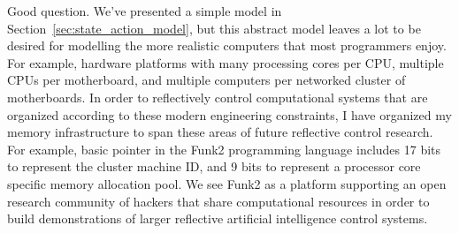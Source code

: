 Good question.  We've presented a simple model in
Section~\ref{sec:state_action_model}, but this abstract model leaves a
lot to be desired for modelling the more realistic computers that most
programmers enjoy.  For example, hardware platforms with many
processing cores per CPU, multiple CPUs per motherboard, and multiple
computers per networked cluster of motherboards.  In order to
reflectively control computational systems that are organized
according to these modern engineering constraints, I have organized my
memory infrastructure to span these areas of future reflective control
research.  For example, basic pointer in the Funk2 programming
language includes 17 bits to represent the cluster machine ID, and 9
bits to represent a processor core specific memory allocation pool.
We see Funk2 as a platform supporting an open research community of
hackers that share computational resources in order to build
demonstrations of larger reflective artificial intelligence control
systems.

